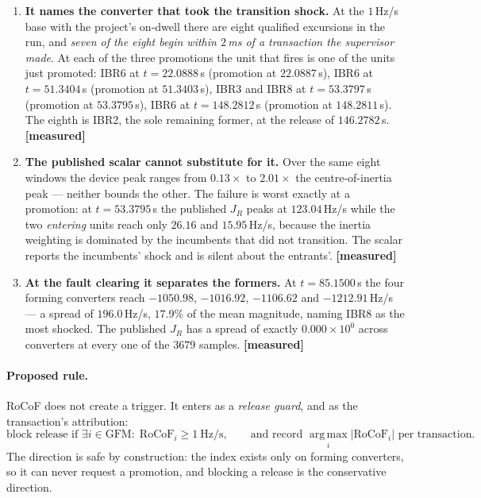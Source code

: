 \documentclass[12pt,a4paper]{article}
\theoremstyle{remark}
\newcommand{\measured}{\textcolor{ok}{\textbf{[measured]}}}
\begin{document}
\begin{enumerate}[leftmargin=1.7em,itemsep=2.5pt]
\item \textbf{It names the converter that took the transition shock.} At the
      $1$\,Hz/s base with the project's on-dwell there are eight qualified
      excursions in the run, and \emph{seven of the eight begin within $2$\,ms of
      a transaction the supervisor made}. At each of the three promotions the
      unit that fires is one of the units just promoted: IBR6 at
      $t = 22.0888$\,s (promotion at $22.0887$\,s), IBR6 at $t = 51.3404$\,s
      (promotion at $51.3403$\,s), IBR3 and IBR8 at $t = 53.3797$\,s (promotion
      at $53.3795$\,s), IBR6 at $t = 148.2812$\,s (promotion at $148.2811$\,s).
      The eighth is IBR2, the sole remaining former, at the release of
      $146.2782$\,s. \measured
\item \textbf{The published scalar cannot substitute for it.} Over the same
      eight windows the device peak ranges from $0.13\times$ to $2.01\times$ the
      centre-of-inertia peak --- neither bounds the other. The failure is worst
      exactly at a promotion: at $t = 53.3795$\,s the published $J_R$ peaks at
      $123.04$\,Hz/s while the two \emph{entering} units reach only $26.16$ and
      $15.95$\,Hz/s, because the inertia weighting is dominated by the incumbents
      that did not transition. The scalar reports the incumbents' shock and is
      silent about the entrants'. \measured
\item \textbf{At the fault clearing it separates the formers.} At
      $t = 85.1500$\,s the four forming converters reach $-1050.98$, $-1016.92$,
      $-1106.62$ and $-1212.91$\,Hz/s --- a spread of $196.0$\,Hz/s, $17.9\%$ of
      the mean magnitude, naming IBR8 as the most shocked. The published $J_R$
      has a spread of exactly $0.000\times10^{0}$ across converters at every one
      of the $3679$ samples. \measured
\end{enumerate}

\paragraph{Proposed rule.} RoCoF does not create a trigger. It enters as a
\emph{release guard}, and as the transaction's attribution:
\begin{equation}
\text{block release if } \exists i \in \mathrm{GFM}:\;
\mathrm{RoCoF}_i \ge 1\ \mathrm{Hz/s},
\qquad
\text{and record } \operatorname*{arg\,max}_i |\mathrm{RoCoF}_i|
\text{ per transaction}.
\label{eq:ruleA}
\end{equation}
The direction is safe by construction: the index exists only on forming
converters, so it can never request a promotion, and blocking a release is the
conservative direction.
\end{document}
